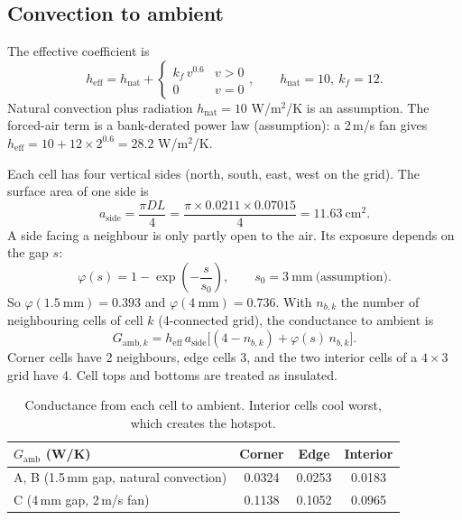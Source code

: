 \documentclass[11pt,a4paper]{article}
\begin{document}
\subsection{Convection to ambient}
The effective coefficient is
\begin{equation}
h_{\mathrm{eff}}=h_{\mathrm{nat}}+\begin{cases}k_f\,v^{0.6}&v>0\\0&v=0\end{cases},\qquad h_{\mathrm{nat}}=10,\ k_f=12 .
\end{equation}
Natural convection plus radiation $h_{\mathrm{nat}}=10$ W/m$^2$/K is an assumption. The forced-air term is a bank-derated power law (assumption): a 2\,m/s fan gives $h_{\mathrm{eff}}=10+12\times2^{0.6}=28.2$ W/m$^2$/K.

Each cell has four vertical sides (north, south, east, west on the grid). The surface area of one side is
\begin{equation}
a_{\mathrm{side}}=\frac{\pi D L}{4}=\frac{\pi\times0.0211\times0.07015}{4}=11.63\ \mathrm{cm}^2 .
\end{equation}
A side facing a neighbour is only partly open to the air. Its exposure depends on the gap $s$:
\begin{equation}
\varphi(s)=1-\exp\!\left(-\frac{s}{s_0}\right),\qquad s_0=3\ \mathrm{mm}\ \text{(assumption)} .
\end{equation}
So $\varphi(1.5\ \mathrm{mm})=0.393$ and $\varphi(4\ \mathrm{mm})=0.736$. With $n_{b,k}$ the number of neighbouring cells of cell $k$ (4-connected grid), the conductance to ambient is
\begin{equation}
G_{\mathrm{amb},k}=h_{\mathrm{eff}}\,a_{\mathrm{side}}\Big[(4-n_{b,k})+\varphi(s)\,n_{b,k}\Big].
\end{equation}
Corner cells have 2 neighbours, edge cells 3, and the two interior cells of a $4\times3$ grid have 4. Cell tops and bottoms are treated as insulated.

\begin{table}[H]
\centering
\begin{tabular}{@{}lccc@{}}
\toprule
$G_{\mathrm{amb}}$ (W/K) & Corner & Edge & Interior \\
\midrule
A, B (1.5\,mm gap, natural convection) & 0.0324 & 0.0253 & 0.0183 \\
C (4\,mm gap, 2\,m/s fan) & 0.1138 & 0.1052 & 0.0965 \\
\bottomrule
\end{tabular}
\caption{Conductance from each cell to ambient. Interior cells cool worst, which creates the hotspot.}
\end{table}
\end{document}
